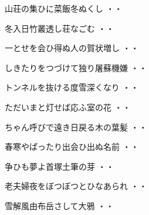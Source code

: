 \begin{shiika}山荘の集ひに菜飯冬ぬくし
\hfill{・・}\end{shiika}
\vspace{0.6cm}
\begin{shiika}冬入日竹叢透し荘なごむ
\hfill{・・}\end{shiika}
\vspace{0.6cm}
\begin{shiika}一とせを会ひ得ぬ人の賀状増し
\hfill{・・}\end{shiika}
\vspace{0.6cm}
\begin{shiika}しきたりをつづけて独り屠蘇機嫌
\hfill{・・}\end{shiika}
\vspace{0.6cm}
\begin{shiika}トンネルを抜ける度雪深くなり
\hfill{・・}\end{shiika}
\vspace{0.6cm}
\begin{shiika}ただいまと灯せば応ふ室の花
\hfill{・・}\end{shiika}
\vspace{0.6cm}
\begin{shiika}ちゃん呼びで遠き日戻る木の葉髪
\hfill{・・}\end{shiika}
\vspace{0.6cm}
\begin{shiika}春寒やぱったり出会ひ出ぬ名前
\hfill{・・}\end{shiika}
\vspace{0.6cm}
\begin{shiika}争ひも夢よ首塚土筆の芽
\hfill{・・}\end{shiika}
\vspace{0.6cm}
\begin{shiika}老夫婦夜をぼつぼつとひなあられ
\hfill{・・}\end{shiika}
\vspace{0.6cm}
\begin{shiika}雪解風由布岳さして大鴉
\hfill{・・}\end{shiika}
\vspace{0.6cm}
